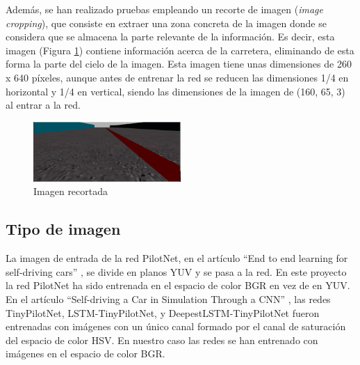 Además, se han realizado pruebas empleando un recorte de imagen (\textit{image cropping}), que consiste en extraer una zona concreta de la imagen donde se considera que se almacena la parte relevante de la información. Es decir, esta imagen (Figura \ref{fig.recortada_reg}) contiene información acerca de la carretera, eliminando de esta forma la parte del cielo de la imagen. Esta imagen tiene unas dimensiones de 260 x 640 píxeles, aunque antes de entrenar la red se reducen las dimensiones 1/4 en horizontal y 1/4 en vertical, siendo las dimensiones de la imagen de (160, 65, 3) al entrar a la red.\\

\begin{figure}
\begin{center}
	\includegraphics[width=0.5\textwidth]{figures/Regresion/img_cropped_reg.png}
   \caption{Imagen recortada}
	\label{fig.recortada_reg}
\end{center}
\end{figure}

\subsection{Tipo de imagen}

La imagen de entrada de la red PilotNet, en el artículo ``End to end learning for self-driving cars'' \cite{end2end}, se divide en planos YUV y se pasa a la red. En este proyecto la red PilotNet ha sido entrenada en el espacio de color BGR en vez de en YUV.\\

En el artículo ``Self-driving a Car in Simulation Through a CNN'' \cite{self-driving}, las redes TinyPilotNet, LSTM-TinyPilotNet, y DeepestLSTM-TinyPilotNet fueron entrenadas con imágenes con un único canal formado por el canal de saturación del espacio de color HSV. En nuestro caso las redes se han entrenado con imágenes en el espacio de color BGR.\\


